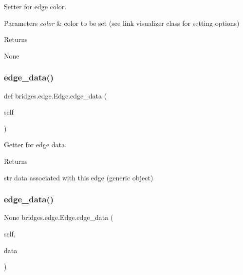 Setter for edge color. 


\begin{DoxyParams}{Parameters}
{\em color} & color to be set (see link visualizer class for setting options) \\
\hline
\end{DoxyParams}
\begin{DoxyReturn}{Returns}


None 
\end{DoxyReturn}
\mbox{\label{classbridges_1_1edge_1_1_edge_abc3f52467d38ad2d7e06113d0c714ed6}} 
\subsubsection{\texorpdfstring{edge\_data()}{edge\_data()}\hspace{0.1cm}{\footnotesize\ttfamily [1/2]}}
{\footnotesize\ttfamily def bridges.\+edge.\+Edge.\+edge\+\_\+data (\begin{DoxyParamCaption}\item[{}]{self }\end{DoxyParamCaption})}



Getter for edge data. 

\begin{DoxyReturn}{Returns}


str data associated with this edge (generic object) 
\end{DoxyReturn}
\mbox{\label{classbridges_1_1edge_1_1_edge_a1ce792ec5e30535e5546eb4d354245eb}} 
\subsubsection{\texorpdfstring{edge\_data()}{edge\_data()}\hspace{0.1cm}{\footnotesize\ttfamily [2/2]}}
{\footnotesize\ttfamily  None bridges.\+edge.\+Edge.\+edge\+\_\+data (\begin{DoxyParamCaption}\item[{}]{self,  }\item[{}]{data }\end{DoxyParamCaption})}



